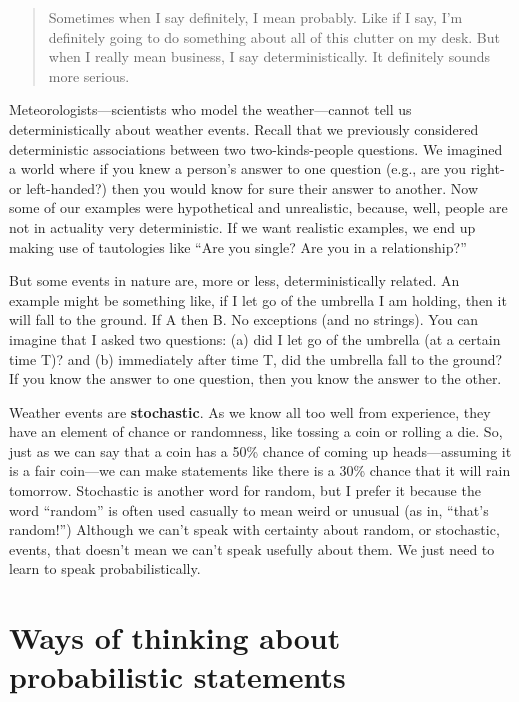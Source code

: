 \documentclass[
  openany]{book}
\begin{document}
\begin{quote}
Sometimes when I say definitely, I mean probably. Like if I say, I'm definitely going to do something about all of this clutter on my desk. But when I really mean business, I say deterministically. It definitely sounds more serious.
\end{quote}

Meteorologists---scientists who model the weather---cannot tell us deterministically about weather events. Recall that we previously considered deterministic associations between two two-kinds-people questions. We imagined a world where if you knew a person's answer to one question (e.g., are you right- or left-handed?) then you would know for sure their answer to another. Now some of our examples were hypothetical and unrealistic, because, well, people are not in actuality very deterministic. If we want realistic examples, we end up making use of tautologies like ``Are you single? Are you in a relationship?''

But some events in nature are, more or less, deterministically related. An example might be something like, if I let go of the umbrella I am holding, then it will fall to the ground. If A then B. No exceptions (and no strings). You can imagine that I asked two questions: (a) did I let go of the umbrella (at a certain time T)? and (b) immediately after time T, did the umbrella fall to the ground? If you know the answer to one question, then you know the answer to the other.

Weather events are \textbf{stochastic}. As we know all too well from experience, they have an element of chance or randomness, like tossing a coin or rolling a die. So, just as we can say that a coin has a 50\% chance of coming up heads---assuming it is a fair coin---we can make statements like there is a 30\% chance that it will rain tomorrow. Stochastic is another word for random, but I prefer it because the word ``random'' is often used casually to mean weird or unusual (as in, ``that's random!'') Although we can't speak with certainty about random, or stochastic, events, that doesn't mean we can't speak usefully about them. We just need to learn to speak probabilistically.

\hypertarget{ways-of-thinking-about-probabilistic-statements}{%
\section*{Ways of thinking about probabilistic statements}\label{ways-of-thinking-about-probabilistic-statements}}
\end{document}
